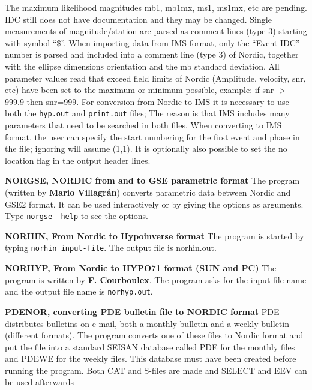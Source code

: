 The maximum likelihood magnitudes mb1, mb1mx, ms1, ms1mx, etc are 
pending. IDC still does not have documentation and they may be changed. \newline
Single measurements of magnitude/station are parsed as comment lines 
(type 3) starting with symbol ``\$''. When importing data from IMS 
format, only the ``Event IDC'' number is parsed and included into a comment 
line (type 3) of Nordic, together with the ellipse dimensions orientation 
and the mb standard deviation. \newline
All parameter values read that exceed 
field limits of Nordic (Amplitude, velocity, snr, etc) have been set 
to the maximum or minimum possible, example: if snr $>$ 999.9 then snr=999. 
For conversion from Nordic to IMS it is necessary to use both the 
\texttt{hyp.out} and \texttt{print.out} files; The reason is that IMS includes 
many parameters that need to be searched in both files. \newline
When converting 
to IMS format, the user can specify the start numbering for the first event and phase 
in the file; ignoring will assume (1,1). It is optionally also possible 
to set the no location flag in the 
output header lines. 

\textbf{NORGSE, NORDIC from and to GSE parametric format} \newline
{}
The program (written by \textbf{Mario Villagr\'an}) converts parametric data 
between Nordic and GSE2 format. It can be 
used interactively or by giving the options as arguments. Type 
\texttt{norgse -help} to see the options.

\textbf{NORHIN, From Nordic to Hypoinverse format} \newline
{}
The program is started by typing \texttt{norhin input-file}. The output file is norhin.out. 

\textbf{NORHYP, From Nordic to HYPO71 format (SUN and PC)} \newline
{}
The program is written by \textbf{F. Courboulex}. The program asks for the 
input file name and the output file name is \texttt{norhyp.out}. 

\textbf{PDENOR, converting PDE bulletin file to NORDIC format} \newline
{}PDE distributes bulletins on e-mail, both a monthly bulletin and a weekly bulletin (different formats). The program converts one of these files to Nordic format and put the file into a standard SEISAN database called PDE for the monthly files and PDEWE for the weekly files. This database must have been created before running the program. Both CAT and S-files are made and SELECT and EEV can be used afterwards  

